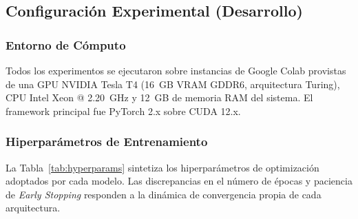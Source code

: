 \documentclass[conference]{IEEEtran}
\begin{document}
\subsection{Configuración Experimental (Desarrollo)}

\subsubsection{Entorno de Cómputo}
Todos los experimentos se ejecutaron sobre instancias de Google Colab provistas de una GPU NVIDIA Tesla T4 (16~GB VRAM GDDR6, arquitectura Turing), CPU Intel Xeon @ 2.20~GHz y 12~GB de memoria RAM del sistema. El framework principal fue PyTorch 2.x sobre CUDA 12.x.

\subsubsection{Hiperparámetros de Entrenamiento}
La Tabla~\ref{tab:hyperparams} sintetiza los hiperparámetros de optimización adoptados por cada modelo. Las discrepancias en el número de épocas y paciencia de \textit{Early Stopping} responden a la dinámica de convergencia propia de cada arquitectura.

\begin{table}[t]
\caption{Hiperparámetros de Entrenamiento por Modelo}
\label{tab:hyperparams}
\begin{center}
\end{center}
\end{table}
\end{document}
